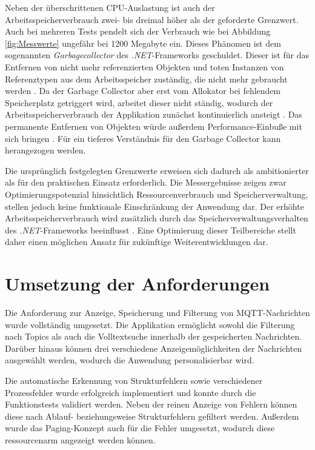 Neben der überschrittenen CPU-Auslastung ist auch der Arbeitsspeicherverbrauch zwei- bis dreimal höher als der geforderte Grenzwert. Auch bei mehreren Tests pendelt sich der Verbrauch wie bei Abbildung \ref{fig:Messwerte} ungefähr bei 1200 Megabyte ein. Dieses Phänomen ist dem sogenannten \textit{Garbagecollector} des \textit{.NET}-Frameworks geschuldet. Dieser ist für das Entfernen von nicht mehr referenzierten Objekten und toten Instanzen von Referenztypen aus dem Arbeitsspeicher zuständig, die nicht mehr gebraucht werden \autocite[22]{garbagecollector}. Da der Garbage Collector aber erst vom Allokator bei fehlendem Speicherplatz getriggert wird, arbeitet dieser nicht ständig, wodurch der Arbeitsspeicherverbrauch der Applikation zunächst kontinuierlich ansteigt \autocite[372--375]{garbagecollector}. Das permanente Entfernen von Objekten würde außerdem Performance-Einbuße mit sich bringen \autocite[372]{garbagecollector}. Für ein tieferes Verständnis für den Garbage Collector kann \autocite{garbagecollector} herangezogen werden.

Die ursprünglich festgelegten Grenzwerte erweisen sich dadurch als ambitionierter als für den praktischen Einsatz erforderlich. Die Messergebnisse zeigen zwar Optimierungspotenzial hinsichtlich Ressourcenverbrauch und Speicherverwaltung, stellen jedoch keine funktionale Einschränkung der Anwendung dar. Der erhöhte Arbeitsspeicherverbrauch wird zusätzlich durch das Speicherverwaltungsverhalten des \textit{.NET}-Frameworks beeinflusst \autocite[135]{garbagecollector}. Eine Optimierung dieser Teilbereiche stellt daher einen möglichen Ansatz für zukünftige Weiterentwicklungen dar. 

\section{Umsetzung der Anforderungen}
Die Anforderung zur Anzeige, Speicherung und Filterung von MQTT-Nachrichten wurde vollständig umgesetzt. Die Applikation ermöglicht sowohl die Filterung nach Topics als auch die Volltextsuche innerhalb der gespeicherten Nachrichten. Darüber hinaus können drei verschiedene Anzeigemöglichkeiten der Nachrichten ausgewählt werden, wodurch die Anwendung personalisierbar wird.

Die automatische Erkennung von Strukturfehlern sowie verschiedener Prozessfehler wurde erfolgreich implementiert und konnte durch die Funktionstests validiert werden. Neben der reinen Anzeige von Fehlern können diese nach Ablauf- beziehungsweise Strukturfehlern gefiltert werden. Außerdem wurde das Paging-Konzept auch für die Fehler umgesetzt, wodurch diese ressourcenarm angezeigt werden können.

